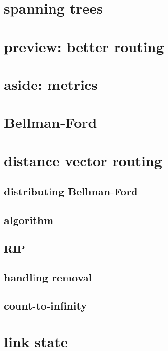 \section{spanning trees}


\section{preview: better routing}


\section{aside: metrics}


\section{Bellman-Ford}


\section{distance vector routing}
\subsection{distributing Bellman-Ford}


\subsection{algorithm}


\subsection{RIP}


\subsection{handling removal}

\subsection{count-to-infinity}

\section{link state}

